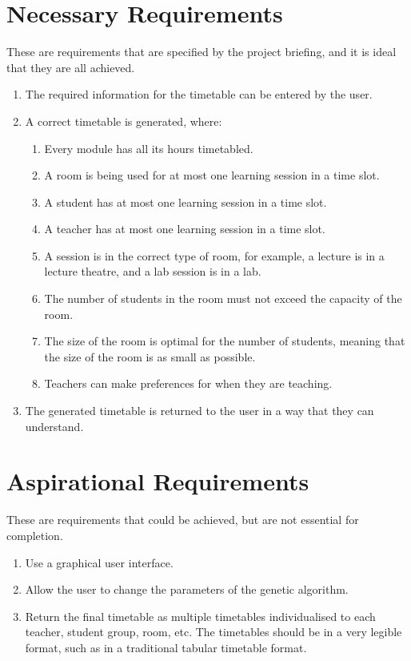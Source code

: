 \section{Necessary Requirements}

These are requirements that are specified by the project briefing, and it is
ideal that they are all achieved.
\begin{enumerate}
	\item The required information for the timetable can be entered by the user.
	\item A correct timetable is generated, where:
	\begin{enumerate}
		\item Every module has all its hours timetabled.
		\item A room is being used for at most one learning session in a time 
			slot.
		\item A student has at most one learning session in a time slot.
		\item A teacher has at most one learning session in a time slot.
		\item A session is in the correct type of room, for example, a lecture
			is in a lecture theatre, and a lab session is in a lab.
		\item The number of students in the room must not exceed the capacity of
			the room.
		\item The size of the room is optimal for the number of students,
			meaning that the size of the room is as small as possible.
		\item Teachers can make preferences for when they are teaching.
	\end{enumerate}
	\item The generated timetable is returned to the user in a way that they can
		understand.
\end{enumerate}

\section{Aspirational Requirements}

These are requirements that could be achieved, but are not essential for
completion.
\begin{enumerate}
	\item Use a graphical user interface.
	\item Allow the user to change the parameters of the genetic algorithm.
	\item Return the final timetable as multiple timetables individualised to
		each teacher, student group, room, etc. The timetables should be in a
		very legible format, such as in a traditional tabular timetable format.
\end{enumerate}